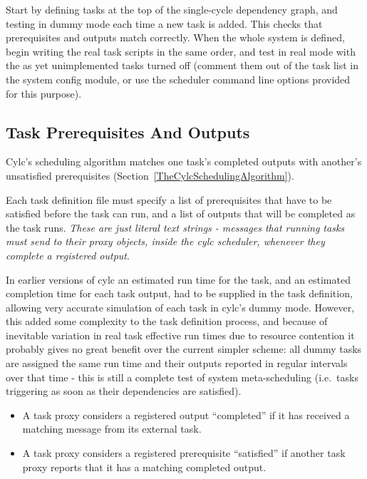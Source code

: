 \documentclass[11pt,a4paper]{article}
\begin{document}
Start by defining tasks at the top of the single-cycle dependency graph,
and testing in dummy mode each time a new task is added. This checks
that prerequisites and outputs match correctly. When the whole system is
defined, begin writing the real task scripts in the same order, and test
in real mode with the as yet unimplemented tasks turned off (comment
them out of the task list in the system config module, or use the
scheduler command line options provided for this purpose). 


\subsection{Task Prerequisites And Outputs}
\label{TaskPrerequisitesAndOutputs}

Cylc's scheduling algorithm matches one task's completed outputs with
another's unsatisfied prerequisites
(Section~\ref{TheCylcSchedulingAlgorithm}).  

Each task definition file must specify a list of prerequisites that have
to be satisfied before the task can run, and a list of outputs that will
be completed as the task runs. {\em These are just literal text
strings - messages that running tasks must send to their proxy objects,
inside the cylc scheduler, whenever they complete a registered output}.

In earlier versions of cylc an estimated run time for the task, and an
estimated completion time for each task output, had to be supplied in
the task definition, allowing very accurate simulation of each task
in cylc's dummy mode.  However, this added some complexity to the task
definition process, and because of inevitable variation in real task
effective run times due to resource contention it probably gives no
great benefit over the current simpler scheme: all dummy tasks are
assigned the same run time and their outputs reported in regular
intervals over that time - this is still a complete test of system
meta-scheduling (i.e.\ tasks triggering as soon as their dependencies
are satisfied). 

\begin{itemize}
    \item A task proxy considers a registered output ``completed''
        if it has received a matching message from its external task.

    \item A task proxy considers a registered prerequisite ``satisfied''
        if another task proxy reports that it has a matching completed
        output.

\end{itemize}
\end{document}
